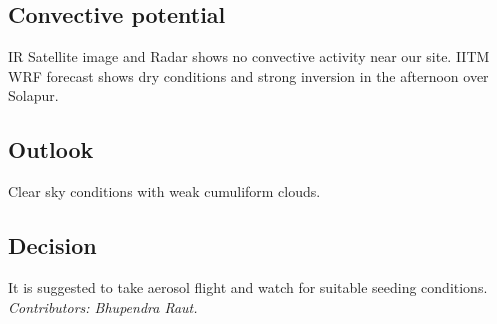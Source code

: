 \subsection*{Convective potential}
IR Satellite image and Radar shows no convective activity near our site. IITM WRF forecast shows dry conditions and strong inversion in the afternoon over Solapur.



\subsection*{Outlook}
Clear sky conditions with weak cumuliform clouds.\\
\subsection*{Decision}
It is suggested to take aerosol flight and watch for suitable seeding conditions.\\

\vfill %
\textit{Contributors: Bhupendra Raut.} 

